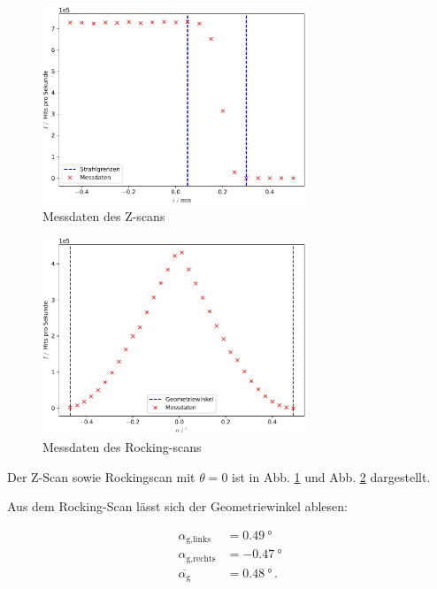 \begin{figure}
    \centering
    \includegraphics[width=0.7\textwidth]{figures/zscan.pdf}
    \caption{Messdaten des Z-scans}
    \label{fig:zscanscan}
\end{figure}

\begin{figure}
    \centering
    \includegraphics[width=0.7\textwidth]{figures/rockingscan.pdf}
    \caption{Messdaten des Rocking-scans}
    \label{fig:rockingscan}
\end{figure}
  \noindent

Der Z-Scan sowie Rockingscan mit $\theta = 0$ ist in Abb. \ref{fig:zscanscan} und Abb. \ref{fig:rockingscan}
dargestellt.

Aus dem Rocking-Scan lässt sich der Geometriewinkel ablesen:

\begin{align*}
  \alpha_\text{g,links} &= \SI{0.49}{\degree} \\
  \alpha_\text{g,rechts} &= \SI{-0.47}{\degree} \\
  \overline{\alpha_\text{g}} &= \SI{0.48}{\degree} \, .
\end{align*}

